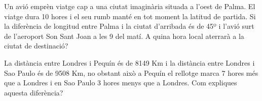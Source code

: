 \begin{activitats}
\begin{mylist}
\exer  Un avió emprèn viatge cap a una  ciutat imaginària situada a l'oest de Palma. El viatge dura 10 hores i el seu rumb manté en tot moment la latitud de partida. Si la diferència de longitud entre Palma i la ciutat d'arribada és de 45º i l'avió surt de l'aeroport Son Sant Joan a les 9 del matí. A quina hora local aterrarà a la ciutat de destinació?


\exer  La distància entre Londres i Pequín és de 8149 Km i la distància entre Londres i Sao Paulo és de 9508 Km, no obstant això a Pequín el rellotge marca 7 hores més que a Londres i en Sao Paulo 3 hores menys que a Londres. Com expliques aquesta diferència?



\end{mylist}
\end{activitats}

